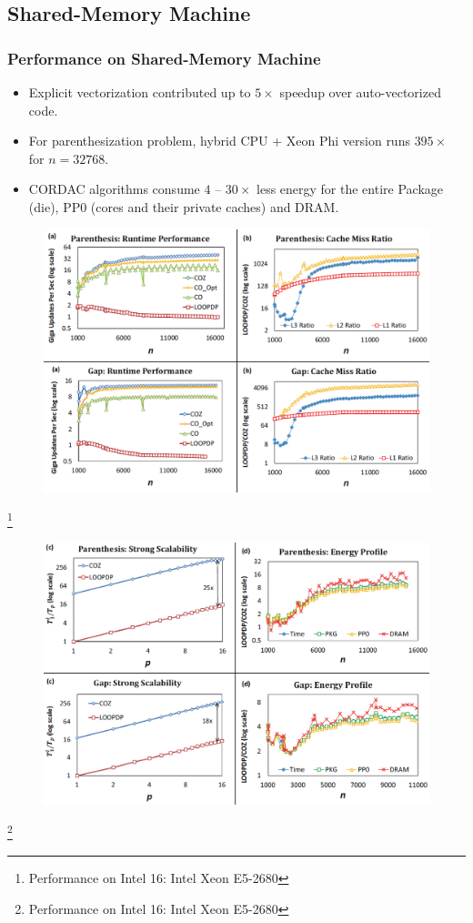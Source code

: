 \subsection{Shared-Memory Machine}
\begin{frame}
    \frametitle{Performance on Shared-Memory Machine}
    \begin{itemize}
    	\item Explicit vectorization contributed up to $5\times$ speedup
    		over auto-vectorized code.
    	\item For parenthesization problem, hybrid CPU + 
    		Xeon Phi version runs $395\times$ for $n = 32768$.
    	\item CORDAC algorithms consume $4$ -- $30\times$ less energy for the entire 
    		Package (die), PP0 (cores and their private caches) and DRAM.
    \end{itemize}
\end{frame}

\begin{frame}
    \begin{figure}
		\includegraphics[scale=0.3]{figure/fig-shared-machine-1.png}
	\end{figure}
	\footnote{Performance on Intel 16: Intel Xeon E5-2680}
\end{frame}

\begin{frame}
    \begin{figure}
		\includegraphics[scale=0.3]{figure/fig-shared-machine-2.png}
	\end{figure}
	\footnote{Performance on Intel 16: Intel Xeon E5-2680}
\end{frame}
